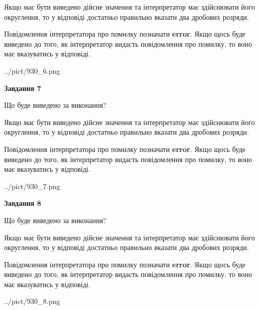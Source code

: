 \documentclass[12pt, ukrainian]{article}
\begin{document}
{\begin {Large}
Якщо має бути виведено дійсне значення та інтерпретатор має здійснювати його округлення, 
то у відповіді достатньо правильно вказати два дробових розряди.

Повідомлення інтерпретатора про помилку позначати \textbf{error}.
Якщо щось буде виведено до того, як інтерпретатор видасть повідомлення про помилку, 
то воно має вказуватись у відповіді. \par

\begin{center}
	{../pict/930_6.png}
\end{center}
\newpage

{\begin {center}\textbf{Завдання 7}\end {center}}\par
Що буде виведено за виконання? \par

Якщо має бути виведено дійсне значення та інтерпретатор має здійснювати його округлення, 
то у відповіді достатньо правильно вказати два дробових розряди.

Повідомлення інтерпретатора про помилку позначати \textbf{error}.
Якщо щось буде виведено до того, як інтерпретатор видасть повідомлення про помилку, 
то воно має вказуватись у відповіді. \par

\begin{center}
	{../pict/930_7.png}
\end{center}
\newpage

{\begin {center}\textbf{Завдання 8}\end {center}}\par
Що буде виведено за виконання? \par

Якщо має бути виведено дійсне значення та інтерпретатор має здійснювати його округлення, 
то у відповіді достатньо правильно вказати два дробових розряди.

Повідомлення інтерпретатора про помилку позначати \textbf{error}.
Якщо щось буде виведено до того, як інтерпретатор видасть повідомлення про помилку, 
то воно має вказуватись у відповіді. \par

\begin{center}
	{../pict/930_8.png}
\end{center}
\newpage


\end{Large}}
\end{document}
